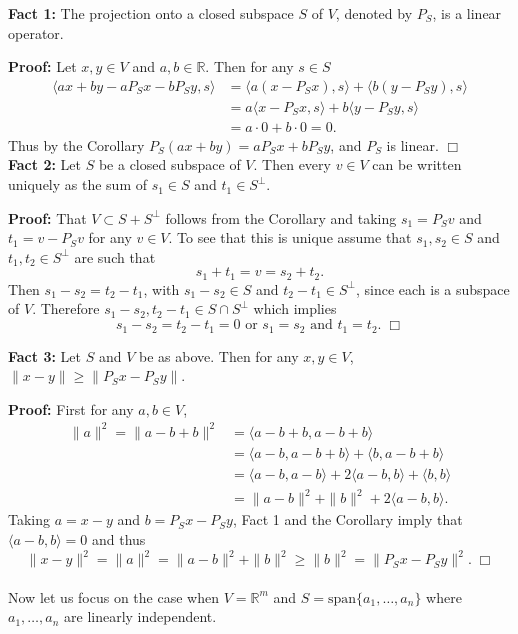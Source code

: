 \documentclass[12pt,oneside]{article}
\begin{document}
\noindent\textbf{Fact 1:} The projection onto a closed subspace \(S \) of \(V\), denoted by \(P_S\), is a linear operator.

\textbf{Proof:} Let \(x,y \in V\) and \(a,b \in \mathbb{R} \). Then for any \(s \in S \)
\begin{align*}
\langle ax+by-aP_Sx-bP_Sy,s \rangle &=  \langle a(x-P_Sx),s \rangle + \langle b(y-P_Sy),s \rangle \\
&= a \langle x-P_Sx,s \rangle + b \langle y-P_Sy,s \rangle \\
& = a\cdot 0+b \cdot 0=0.
\end{align*}
Thus by the Corollary \( P_S(ax+by)=aP_Sx+bP_Sy\), and \(P_S\) is linear. \(\Box\) \\

\noindent\textbf{Fact 2:} Let \(S\) be a closed subspace of \(V\). Then every \(v \in V\) can be written uniquely as the sum of \(s_1 \in S\) and \( t_1 \in S^{\perp}\).

\textbf{Proof:} That \( V \subset S + S^{\perp} \) follows from the Corollary and taking \(s_1=P_Sv\) and \(t_1=v-P_Sv\) for any \(v \in V\). To see that this is unique assume that \(s_1,s_2 \in S\) and \(t_1,t_2\in S^{\perp} \) are such that 
\[ s_1+t_1=v=s_2+t_2.\]
Then \(s_1-s_2=t_2-t_1\), with \(s_1-s_2 \in S\) and \( t_2-t_1 \in S^{\perp}\), since each is a subspace of \( V\). Therefore \( s_1-s_2,t_2-t_1 \in S \cap S^{\perp}\) which implies 
\[s_1-s_2=t_2-t_1=0 \text{    or   } s_1=s_2 \text{  and  } t_1=t_2.\; \Box\]


\noindent\textbf{Fact 3:} Let \(S \) and \(V\) be as above. Then for any \(x,y \in V \), \( \|x-y\| \ge \|P_Sx -P_Sy\| \).

\textbf{Proof:} First for any \(a,b \in V\),
\begin{align*}
\|a\|^2=\|a-b+b\|^2&= \langle a-b+b,a-b+b \rangle \\
&= \langle a-b,a-b+b \rangle + \langle b,a-b+b \rangle \\
&= \langle a-b,a-b \rangle +2 \langle a-b,b \rangle + \langle b,b \rangle \\
&=\|a-b\|^2+\|b\|^2+2 \langle a-b,b \rangle. 
\end{align*}
Taking \(a=x-y\) and \(b=P_Sx-P_Sy\), Fact 1 and the Corollary imply that \( \langle a-b,b \rangle =0 \) and thus 
\[ \|x-y\|^2 = \|a\|^2=\|a-b\|^2 +\|b\|^2 \ge \|b\|^2=\|P_Sx-P_Sy \|^2.\; \Box \]\\


Now let us focus on the case when \(V=\mathbb{R}^m\) and \(S=\text{span}\{a_1,\dots,a_n\} \) where \(a_1,\dots,a_n\) are linearly independent. 
\end{document}
